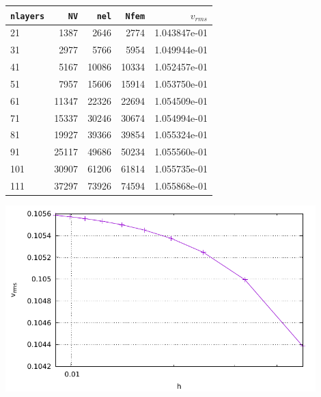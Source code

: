 \begin{center}
\begin{tabular}{lrrrr}
\hline
{\tt nlayers} & {\tt NV} & {\tt nel} & {\tt Nfem} & $v_{rms}$\\
\hline
\hline
21  &  1387 &  2646 &  2774 & 1.043847e-01\\ 
31  &  2977 &  5766 &  5954 & 1.049944e-01\\
41  &  5167 & 10086 & 10334 & 1.052457e-01\\
51  &  7957 & 15606 & 15914 & 1.053750e-01\\
61  & 11347 & 22326 & 22694 & 1.054509e-01\\
71  & 15337 & 30246 & 30674 & 1.054994e-01\\
81  & 19927 & 39366 & 39854 & 1.055324e-01\\
91  & 25117 & 49686 & 50234 & 1.055560e-01\\
101 & 30907 & 61206 & 61814 & 1.055735e-01\\
111 & 37297 & 73926 & 74594 & 1.055868e-01\\
\hline
\end{tabular}

\includegraphics[width=12cm]{python_codes/fieldstone_58/experiment1/vrms}
\end{center}


